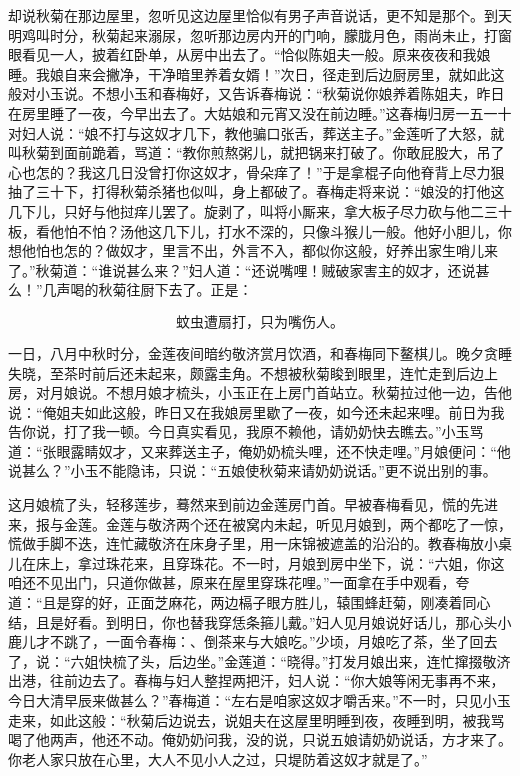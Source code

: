 却说秋菊在那边屋里，忽听见这边屋里恰似有男子声音说话，更不知是那个。到天明鸡叫时分，秋菊起来溺尿，忽听那边房内开的门响，朦胧月色，雨尚未止，打窗眼看见一人，披着红卧单，从房中出去了。“恰似陈姐夫一般。原来夜夜和我娘睡。我娘自来会撇净，干净暗里养着女婿！”次日，径走到后边厨房里，就如此这般对小玉说。不想小玉和春梅好，又告诉春梅说：“秋菊说你娘养着陈姐夫，昨日在房里睡了一夜，今早出去了。大姑娘和元宵又没在前边睡。”这春梅归房一五一十对妇人说：“娘不打与这奴才几下，教他骗口张舌，葬送主子。”金莲听了大怒，就叫秋菊到面前跪着，骂道：“教你煎熬粥儿，就把锅来打破了。你敢屁股大，吊了心也怎的？我这几日没曾打你这奴才，骨朵痒了！”于是拿棍子向他脊背上尽力狠抽了三十下，打得秋菊杀猪也似叫，身上都破了。春梅走将来说：“娘没的打他这几下儿，只好与他挝痒儿罢了。旋剥了，叫将小厮来，拿大板子尽力砍与他二三十板，看他怕不怕？汤他这几下儿，打水不深的，只像斗猴儿一般。他好小胆儿，你想他怕也怎的？做奴才，里言不出，外言不入，都似你这般，好养出家生哨儿来了。”秋菊道：“谁说甚么来？”妇人道：“还说嘴哩！贼破家害主的奴才，还说甚么！”几声喝的秋菊往厨下去了。正是：

\[
蚊虫遭扇打，只为嘴伤人。
\]

一日，八月中秋时分，金莲夜间暗约敬济赏月饮酒，和春梅同下鳌棋儿。晚夕贪睡失晓，至茶时前后还未起来，颇露圭角。不想被秋菊睃到眼里，连忙走到后边上房，对月娘说。不想月娘才梳头，小玉正在上房门首站立。秋菊拉过他一边，告他说：“俺姐夫如此这般，昨日又在我娘房里歇了一夜，如今还未起来哩。前日为我告你说，打了我一顿。今日真实看见，我原不赖他，请奶奶快去瞧去。”小玉骂道：“张眼露睛奴才，又来葬送主子，俺奶奶梳头哩，还不快走哩。”月娘便问：“他说甚么？”小玉不能隐讳，只说：“五娘使秋菊来请奶奶说话。”更不说出别的事。

这月娘梳了头，轻移莲步，蓦然来到前边金莲房门首。早被春梅看见，慌的先进来，报与金莲。金莲与敬济两个还在被窝内未起，听见月娘到，两个都吃了一惊，慌做手脚不迭，连忙藏敬济在床身子里，用一床锦被遮盖的沿沿的。教春梅放小桌儿在床上，拿过珠花来，且穿珠花。不一时，月娘到房中坐下，说：“六姐，你这咱还不见出门，只道你做甚，原来在屋里穿珠花哩。”一面拿在手中观看，夸道：“且是穿的好，正面芝麻花，两边槅子眼方胜儿，辕围蜂赶菊，刚凑着同心结，且是好看。到明日，你也替我穿恁条箍儿戴。”妇人见月娘说好话儿，那心头小鹿儿才不跳了，一面令春梅：、倒茶来与大娘吃。”少顷，月娘吃了茶，坐了回去了，说：“六姐快梳了头，后边坐。”金莲道：“晓得。”打发月娘出来，连忙撺掇敬济出港，往前边去了。春梅与妇人整捏两把汗，妇人说：“你大娘等闲无事再不来，今日大清早辰来做甚么？”春梅道：“左右是咱家这奴才嚼舌来。”不一时，只见小玉走来，如此这般：“秋菊后边说去，说姐夫在这屋里明睡到夜，夜睡到明，被我骂喝了他两声，他还不动。俺奶奶问我，没的说，只说五娘请奶奶说话，方才来了。你老人家只放在心里，大人不见小人之过，只堤防着这奴才就是了。”

